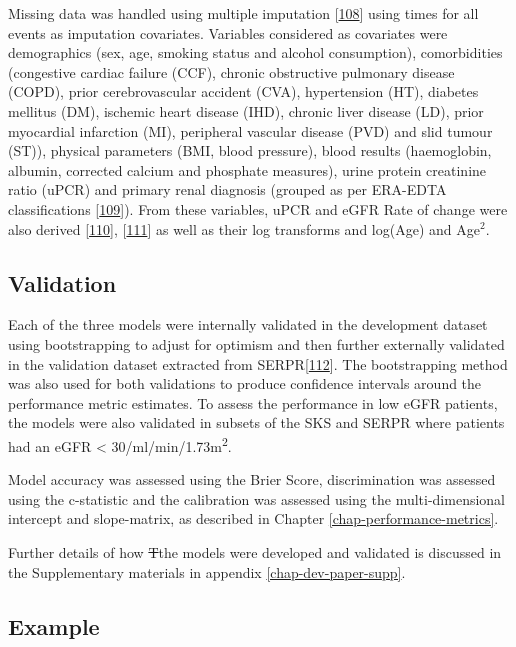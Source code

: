 \documentclass[12pt,PhD,twoside,openright]{muthesis}
\begin{document}
Missing data was handled using multiple imputation {[}\protect\hyperlink{ref-white_imputing_2009}{108}{]} using times for all events as imputation covariates. Variables considered as covariates were demographics (sex, age, smoking status and alcohol consumption), comorbidities (congestive cardiac failure (CCF), chronic obstructive pulmonary disease (COPD), prior cerebrovascular accident (CVA), hypertension (HT), diabetes mellitus (DM), ischemic heart disease (IHD), chronic liver disease (LD), prior myocardial infarction (MI), peripheral vascular disease (PVD) and slid tumour (ST)), physical parameters (BMI, blood pressure), blood results (haemoglobin, albumin, corrected calcium and phosphate measures), urine protein creatinine ratio (uPCR) and primary renal diagnosis (grouped as per ERA-EDTA classifications {[}\protect\hyperlink{ref-venkat-raman_new_2012}{109}{]}). From these variables, uPCR and eGFR Rate of change were also derived {[}\protect\hyperlink{ref-kovesdy_past_2016}{110}{]}, {[}\protect\hyperlink{ref-naimark_past_2016}{111}{]} as well as their log transforms and log(Age) and Age\(^2\).

\hypertarget{validation}{%
\subsection{Validation}\label{validation}}

Each of the three models were internally validated in the development dataset using bootstrapping to adjust for optimism and then further externally validated in the validation dataset extracted from SERPR{[}\protect\hyperlink{ref-schomaker_bootstrap_2018}{112}{]}. The bootstrapping method was also used for both validations to produce confidence intervals around the performance metric estimates. To assess the performance in low eGFR patients, the models were also validated in subsets of the SKS and SERPR where patients had an eGFR \textless{} 30/ml/min/1.73m\textsuperscript{2}.

Model accuracy was assessed using the Brier Score, discrimination was assessed using the c-statistic and the calibration was assessed using the multi-dimensional intercept and slope-matrix, as described in Chapter \ref{chap-performance-metrics}.

Further details of how \sout{T}the models were developed and validated is discussed in the Supplementary materials in appendix \ref{chap-dev-paper-supp}.

\hypertarget{example}{%
\subsection{Example}\label{example}}
\end{document}
